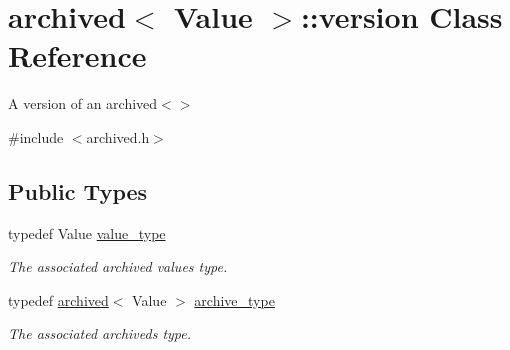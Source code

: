 \hypertarget{classarchived_1_1version}{}\section{archived$<$ Value $>$\+:\+:version Class Reference}
\label{classarchived_1_1version}


A version of an archived$<$$>$  




{\ttfamily \#include $<$archived.\+h$>$}

\subsection*{Public Types}
\begin{DoxyCompactItemize}
\item 
\hypertarget{classarchived_1_1version_ae9028b053631ebb7832c9457cac4c29b}{}typedef Value \hyperlink{classarchived_1_1version_ae9028b053631ebb7832c9457cac4c29b}{value\+\_\+type}\label{classarchived_1_1version_ae9028b053631ebb7832c9457cac4c29b}

\begin{DoxyCompactList}\small\item\em The associated archived value\textquotesingle{}s type. \end{DoxyCompactList}\item 
\hypertarget{classarchived_1_1version_a791c80c76addc75c5ee41f31ae41817a}{}typedef \hyperlink{classarchived}{archived}$<$ Value $>$ \hyperlink{classarchived_1_1version_a791c80c76addc75c5ee41f31ae41817a}{archive\+\_\+type}\label{classarchived_1_1version_a791c80c76addc75c5ee41f31ae41817a}

\begin{DoxyCompactList}\small\item\em The associated archived\textquotesingle{}s type. \end{DoxyCompactList}\end{DoxyCompactItemize}

